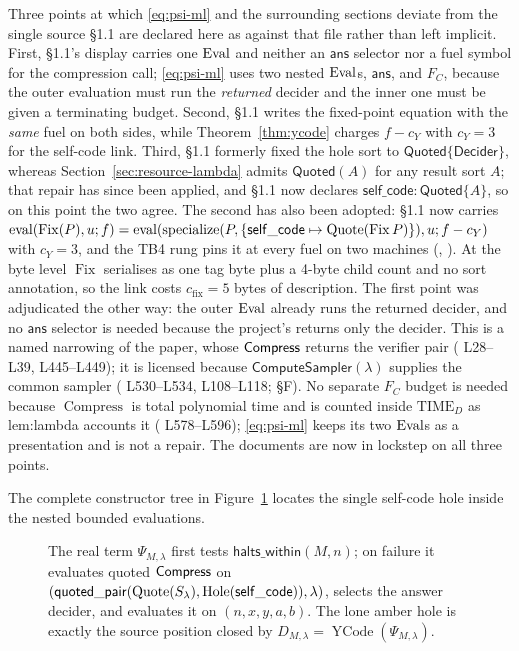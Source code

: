 Three points at which \eqref{eq:psi-ml} and the surrounding sections deviate
from the single source  \S1.1 are declared here as
 against that file rather than left implicit.  First,
\S1.1's display carries one \(\operatorname{Eval}\) and neither an \(\mathsf{ans}\) selector
nor a fuel symbol for the compression call; \eqref{eq:psi-ml} uses two nested
\(\operatorname{Eval}\)s, \(\mathsf{ans}\), and \(F_C\), because the outer evaluation must
run the \emph{returned} decider and the inner one must be given a terminating
budget.  Second, \S1.1 writes the fixed-point equation with the \emph{same}
fuel on both sides, while Theorem~\ref{thm:ycode} charges \(f-c_Y\) with
\(c_Y=3\) for the self-code link.  Third, \S1.1 formerly fixed the hole sort
to \(\mathsf{Quoted}\{\mathsf{Decider}\}\), whereas
Section~\ref{sec:resource-lambda} admits \(\mathsf{Quoted}(A)\) for any result
sort \(A\); that repair has since been applied, and  \S1.1
now declares \(\mathsf{self\_code}:\mathsf{Quoted}\{A\}\), so on this point
the two agree.  The second has also been adopted:  \S1.1 now
carries \(\mathrm{eval}(\operatorname{Fix}(P),u;f)=\mathrm{eval}(\mathrm{specialize}(P,\{\mathsf{self\_code}\mapsto\operatorname{Quote}(\operatorname{Fix}P)\}),u;f-c_Y)\)
with \(c_Y=3\), and the TB4 rung pins it at every fuel on two machines
(, ).  At the byte level
\(\operatorname{Fix}\) serialises as one tag byte plus a 4-byte child count and
no sort annotation, so the link costs \(c_{\mathrm{fix}}=5\) bytes of description.
The first point was adjudicated the other way: the outer \(\operatorname{Eval}\) already
runs the returned decider, and no \(\mathsf{ans}\) selector is needed because
the project's  returns only the decider.  This is a named
narrowing of the paper, whose \(\mathsf{Compress}\) returns the verifier pair
( L28--L39, L445--L449); it is licensed because
\(\mathsf{ComputeSampler}(\lambda)\) supplies the common sampler
( L530--L534, L108--L118;  \S F).
No separate
\(F_C\) budget is needed because \(\operatorname{Compress}\) is total
polynomial time and is counted inside \(\mathrm{TIME}_D\) as lem:lambda
accounts it ( L578--L596); \eqref{eq:psi-ml} keeps its two
\(\operatorname{Eval}\)s as a presentation and is not a repair.  The documents are now
in lockstep on all three points.

The complete constructor tree in Figure~\ref{fig:psi-ml} locates the single
self-code hole inside the nested bounded evaluations.
\begin{figure}[H]
\centering

\caption{The real term \(\Psi_{M,\lambda}\) first tests \(\mathsf{halts\_within}(M,n)\); on failure it evaluates quoted \(\mathsf{Compress}\) on \((\mathsf{quoted\_pair}(\operatorname{Quote}(S_\lambda),\operatorname{Hole}(\mathsf{self\_code})),\lambda)\), selects the answer decider, and evaluates it on \((n,x,y,a,b)\).  The lone amber hole is exactly the source position closed by \(D_{M,\lambda}=\operatorname{YCode}(\Psi_{M,\lambda})\).}
\label{fig:psi-ml}
\end{figure}

